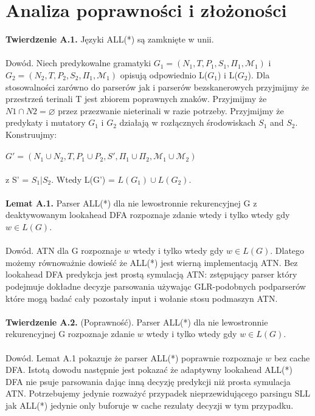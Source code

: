 ﻿\section{Analiza poprawności i złożoności}
\textbf{Twierdzenie A.1.} Języki ALL(*) są zamknięte w unii.
\\ \\
Dowód. Niech predykowalne gramatyki $G_1 = (N_1, T, P_1, S_1, \Pi_1,\mathcal{M}_1)$
i $G_2 = (N_2, T, P_2, S_2, \Pi_1,\mathcal{M}_1)$ opisują odpowiednio L($G_1$) i L($G_2$).
Dla stosowalności zarówno do parserów jak i parserów bezskanerowych
przyjmijmy że przestrzeń terinali T jest zbiorem poprawnych znaków.
Przyjmijmy że  $N1 \cap N2 = \varnothing$ przez przezwanie nieterinali
w razie potrzeby.
Przyjmijmy że predykaty i mutatory $G_1$ i
$G_2$ działają w rozłącznych środowiskach $S_1$ and $S_2$.
Konstruujmy:
\\ \\
$G' = (N_1 \cup N_2, T, P_1 \cup P_2, S',\Pi_1 \cup \Pi_2,\mathcal{M}_1 \cup \mathcal{M}_2)$
\\ \\
z S' = $S_1 | S_2$. Wtedy L(G') = $L(G_1) \cup L(G_2)$.
\\ \\
\textbf{Lemat A.1.} Parser ALL(*) dla nie lewostronnie rekurencyjnej G z
deaktywowanym lookahead DFA rozpoznaje zdanie wtedy i tylko wtedy gdy  $w \in L(G)$.
\\ \\
Dowód. ATN dla G rozpoznaje $w$ wtedy i tylko wtedy gdy $w \in L(G)$.
Dlatego możemy równoważnie dowieść że ALL(*) jest
wierną implementacją ATN. Bez lookahead DFA predykcja jest
prostą symulacją ATN: zstępujący parser który podejmuje
dokładne decyzje parsowania używając GLR-podobnych podparserów które
mogą badać cały pozostały input i wołanie stosu podmaszyn ATN.
\\ \\
\textbf{Twierdzenie A.2.} (Poprawność). Parser ALL(*) dla nie lewostronnie
rekurencyjnej G rozpoznaje zdanie $w$ wtedy i tylko wtedy gdy $w \in L(G)$.
\\ \\
Dowód. Lemat A.1 pokazuje że parser ALL(*) poprawnie rozpoznaje
$w$ bez cache DFA. Istotą dowodu
następnie jest pokazać że adaptywny lookahead ALL(*) DFA nie
psuje parsowania dając inną decyzję predykcji niż
prosta symulacja ATN. Potrzebujemy jedynie rozważyć
przypadek nieprzewidującego parsingu SLL jak ALL(*)
jedynie only buforuje w cache rezulaty decyzji w tym przypadku.
\par
